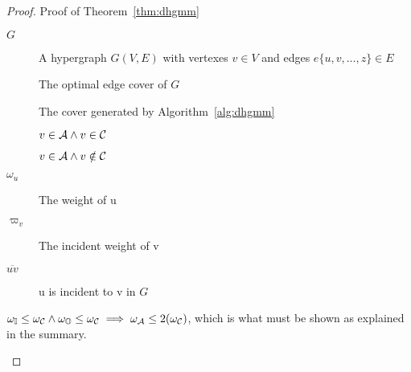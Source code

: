 \begin{proof}{Proof of Theorem~\ref{thm:dhgmm}}
  \begin{dfn}
    \begin{description}
    \item[$G$] A hypergraph $G(V,E)$ with vertexes $v \in V$ and edges $e\{u,v,...,z\} \in E$
    \item[\cCd] The optimal edge cover of $G$
    \item[\cAd] The cover generated by Algorithm~\ref{alg:dhgmm}
    \item[\bId] $v \in {\mathcal A} \land v\in {\mathcal C}$
    \item[\bOd] $v \in {\mathcal A} \land v\notin {\mathcal C}$
    \item[$\omega_u$] The weight of u
    \item[$\varpi_v$] The incident weight of v
    \item[$ \overline{uv} $] u is incident to v in $G$
    \end{description}
  \end{dfn}
  \begin{prop}
    $\omega_{{\mathbb I}} \le \omega_{{\mathcal C}} \land \omega_{{\mathbb O}} \le \omega_{{\mathcal C}} \implies \omega_{{\mathcal A}} \le 2(\omega_{{\mathcal C}})$, which is what must be shown as explained in the summary.
    \label{prp:weightcomp}
  \end{prop}


\end{proof}
